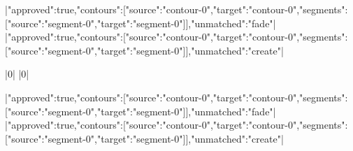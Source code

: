 \documentclass{article}
\begin{document}
\begin{loomscene}[width=960,height=540,duration=16,title={Geometry in transition}]
\begin{loomanimation}[origin=0.5]
\begin{loomparallel}
\begin{loomsequence}
    \end{loomsequence}
    \begin{loomsequence}
      \begin{loomparallel}
        |{"approved":true,"contours":[{"source":"contour-0","target":"contour-0","segments":[{"source":"segment-0","target":"segment-0"}]}],"unmatched":"fade"}|
        |{"approved":true,"contours":[{"source":"contour-0","target":"contour-0","segments":[{"source":"segment-0","target":"segment-0"}]}],"unmatched":"create"}|
      \end{loomparallel}
      |0|
      |0|
      \begin{loomparallel}
        |{"approved":true,"contours":[{"source":"contour-0","target":"contour-0","segments":[{"source":"segment-0","target":"segment-0"}]}],"unmatched":"fade"}|
        |{"approved":true,"contours":[{"source":"contour-0","target":"contour-0","segments":[{"source":"segment-0","target":"segment-0"}]}],"unmatched":"create"}|
      \end{loomparallel}
    \end{loomsequence}
  \end{loomparallel}
\end{loomanimation}
\end{loomscene}
\end{document}
